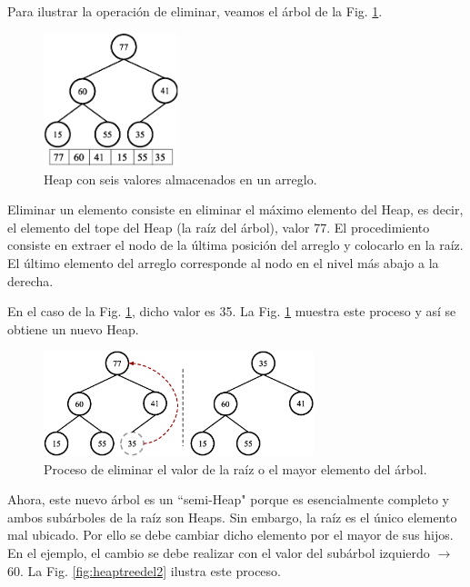 Para ilustrar la operación de eliminar, veamos el árbol de la Fig. \ref{fig:heaptree}.

\begin{figure}[htpb!]
  \begin{center}
    \includegraphics[width=0.35\textwidth]{images/heaptree.eps}
  \end{center}
  \caption{Heap con seis valores almacenados en un arreglo.}
  \label{fig:heaptree}
\end{figure}

Eliminar un elemento consiste en eliminar el máximo elemento del Heap, es decir, el elemento del tope del Heap (la raíz del árbol), valor 77. El procedimiento consiste en extraer el nodo de la última posición del arreglo y colocarlo en la raíz. El último elemento del arreglo corresponde al nodo en el nivel más abajo a la derecha. 

En el caso de la Fig. \ref{fig:heaptree}, dicho valor es 35. La Fig. \ref{fig:heaptree} muestra este proceso y así se obtiene un nuevo Heap.

\begin{figure}[htpb!]
  \begin{center}
    \includegraphics[width=0.7\textwidth]{images/heaptreedel1.eps}
  \end{center}
  \caption{Proceso de eliminar el valor de la raíz o el mayor elemento del árbol.}
  \label{fig:heaptreedel1}
\end{figure}

Ahora, este nuevo árbol es un ``semi-Heap" porque es esencialmente completo y ambos subárboles de la raíz son Heaps. Sin embargo, la raíz es el único elemento mal ubicado. Por ello se debe cambiar dicho elemento por el mayor de sus hijos. En el ejemplo, el cambio se debe realizar con el valor del subárbol izquierdo $\rightarrow$ 60. La Fig. \ref{fig:heaptreedel2} ilustra este proceso.

